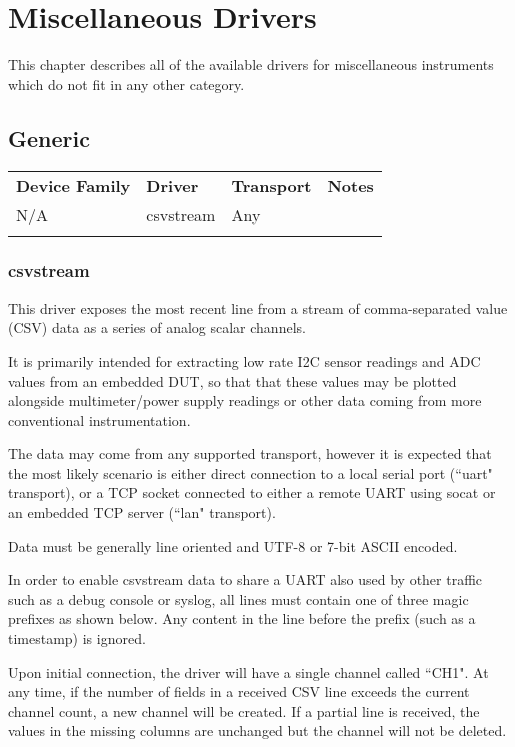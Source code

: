 \chapter{Miscellaneous Drivers}
\label{sec:misc-drivers}

This chapter describes all of the available drivers for miscellaneous instruments which do not fit in any other
category.

\section{Generic}

\begin{tabularx}{16cm}{lllX}
\thickhline
\textbf{Device Family} & \textbf{Driver} & \textbf{Transport} & \textbf{Notes} \\
\thickhline
N/A & csvstream & Any & \\
\thickhline
\end{tabularx}

\subsection{csvstream}

This driver exposes the most recent line from a stream of comma-separated value (CSV) data as a series of analog scalar
channels.

It is primarily intended for extracting low rate I2C sensor readings and ADC values from an embedded DUT, so that that
these values may be plotted alongside multimeter/power supply readings or other data coming from more conventional
instrumentation.

The data may come from any supported transport, however it is expected that the most likely scenario is either direct
connection to a local serial port (``uart" transport), or a TCP socket connected to either a remote UART using socat or
an embedded TCP server (``lan" transport).

Data must be generally line oriented and UTF-8 or 7-bit ASCII encoded.

In order to enable csvstream data to share a UART also used by other traffic such as a debug console or syslog, all
lines must contain one of three magic prefixes as shown below. Any content in the line before the prefix (such as a
timestamp) is ignored.

Upon initial connection, the driver will have a single channel called ``CH1". At any time, if the number of fields in a
received CSV line exceeds the current channel count, a new channel will be created. If a partial line is received, the
values in the missing columns are unchanged but the channel will not be deleted.

